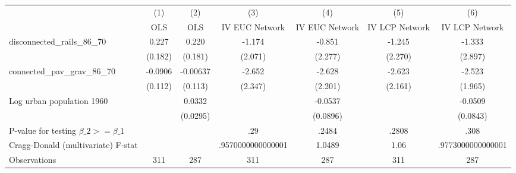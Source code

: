 {
\def\sym#1{\ifmmode^{#1}\else\(^{#1}\)\fi}
\begin{tabular}{l*{6}{c}}
\hline\hline
                &\multicolumn{1}{c}{(1)}&\multicolumn{1}{c}{(2)}&\multicolumn{1}{c}{(3)}&\multicolumn{1}{c}{(4)}&\multicolumn{1}{c}{(5)}&\multicolumn{1}{c}{(6)}\\
                &\multicolumn{1}{c}{OLS}&\multicolumn{1}{c}{OLS}&\multicolumn{1}{c}{IV EUC Network}&\multicolumn{1}{c}{IV EUC Network}&\multicolumn{1}{c}{IV LCP Network}&\multicolumn{1}{c}{IV LCP Network}\\
\hline
disconnected\_rails\_86\_70&    0.227         &    0.220         &   -1.174         &   -0.851         &   -1.245         &   -1.333         \\
                &  (0.182)         &  (0.181)         &  (2.071)         &  (2.277)         &  (2.270)         &  (2.897)         \\
[1em]
connected\_pav\_grav\_86\_70&  -0.0906         & -0.00637         &   -2.652         &   -2.628         &   -2.623         &   -2.523         \\
                &  (0.112)         &  (0.113)         &  (2.347)         &  (2.201)         &  (2.161)         &  (1.965)         \\
[1em]
Log urban population 1960&                  &   0.0332         &                  &  -0.0537         &                  &  -0.0509         \\
                &                  & (0.0295)         &                  & (0.0896)         &                  & (0.0843)         \\
\hline
P-value for testing $\beta\_{2} >= \beta\_{1}$&                  &                  &      .29         &    .2484         &    .2808         &     .308         \\
Cragg-Donald (multivariate) F-stat&                  &                  &.9570000000000001         &   1.0489         &     1.06         &.9773000000000001         \\
Observations    &      311         &      287         &      311         &      287         &      311         &      287         \\
\hline\hline
\end{tabular}
}
